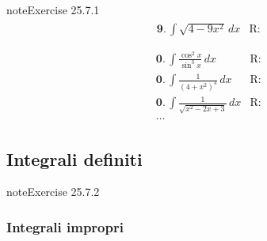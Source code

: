 \documentclass[letterpaper,10pt,italian]{jupyterBook}
\begin{document}
\begin{sphinxadmonition}{note}{Exercise 25.7.1}
\begin{equation*}
\begin{split}
\begin{aligned}
 & \mathbf{9.} \,  \int \sqrt{4 - 9 x^2} \, dx & \text{R: } \\
\end{aligned}\end{split}
\end{equation*}\begin{equation*}
\begin{split}\begin{aligned}
 & \mathbf{0.} \,  \int \frac{\cos^2 x}{\sin^3 x} \, dx & \text{R: } \\
 & \mathbf{0.} \,  \int \frac{1}{(4+x^2)^3} \, dx & \text{R: } \\
 & \mathbf{0.} \,  \int \frac{1}{\sqrt{x^2 - 2x + 3}} \, dx & \text{R: } \\
 & \dots
\end{aligned}\end{split}
\end{equation*}\end{sphinxadmonition}


\subsection{Integrali definiti}
\label{\detokenize{ch/infinitesimal_calculus/integrals-problems:integrali-definiti}} \label{exercise:ch/infinitesimal_calculus/integrals-problems-exercise-1}

\begin{sphinxadmonition}{note}{Exercise 25.7.2}



\sphinxAtStartPar
{}
\end{sphinxadmonition}


\subsubsection{Integrali impropri}
\label{\detokenize{ch/infinitesimal_calculus/integrals-problems:integrali-impropri}} \label{exercise:ch/infinitesimal_calculus/integrals-problems-exercise-2}
\end{document}
